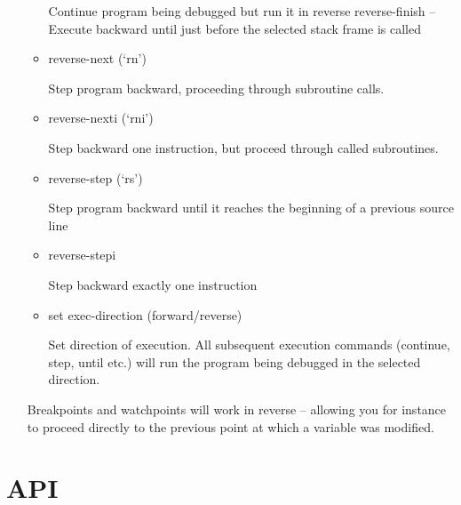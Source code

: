 \documentclass{article}
\begin{document}
\begin{enumerate}
\begin{itemize}
Continue program being debugged but run it in reverse
reverse-finish -- Execute backward until just before the selected stack frame is called
\item reverse-next (`rn')

Step program backward, proceeding through subroutine calls.
\item reverse-nexti (`rni')

Step backward one instruction, but proceed through called subroutines.
\item reverse-step (`rs') 

Step program backward until it reaches the beginning of a previous source line
\item reverse-stepi

Step backward exactly one instruction

\item set exec-direction (forward/reverse)

Set direction of execution.
All subsequent execution commands (continue, step, until etc.) will run the program being debugged in the selected direction.
\end{itemize}

Breakpoints and watchpoints will work in reverse -- allowing you for instance to proceed directly to the previous point at which a variable was modified.

\end{enumerate}

\section{API}
\end{document}
